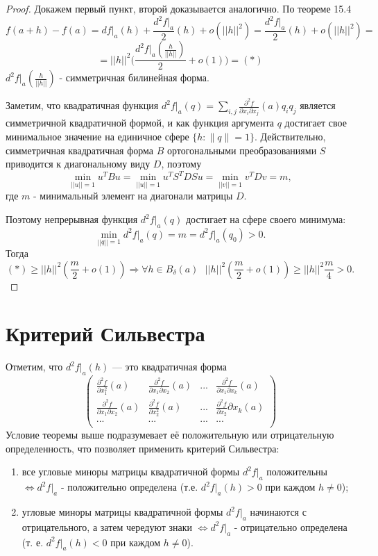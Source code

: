     \begin{proof}
    	Докажем первый пункт, второй доказывается аналогично. По теореме 15.4
    	\[ f(a + h) - f(a) = df|_a(h) + \frac{d^2f|_a}{2}(h) + o(||h||^2) = \frac{d^2f|_a}{2}(h) + o(||h||^2) = \]
    	\[ = ||h||^2 \bigg(\frac{d^2f|_a(\frac{h}{||h||})}{2} + o(1)\bigg) = (*) \]
    	$d^2f|_a(\frac{h}{||h||})$ - симметричная билинейная форма.
    	
    	Заметим, что квадратичная функция $d^2f\bigl|_a(q) = \sum_{i,j}\frac{\partial^2 f}{\partial x_i\partial x_j}(a)q_iq_j$ является симметричной квадратичной формой, и
    	как функция аргумента $q$ достигает свое минимальное значение на единичное сфере $\{h\colon \|q\|=1\}$. Действительно, симметричная квадратичная форма $B$ ортогональными преобразованиями $S$ приводится к диагональному виду $D$, поэтому
    	$$\min_{||u||=1} u^TBu = \min_{||u||=1} u^TS^TDSu = \min_{||v||=1} v^TDv = m,$$
    	где $m$ - минимальный элемент на диагонали матрицы $D$.
    	
    	Поэтому непрерывная функция $d^2f\bigl|_a(q)$ достигает на сфере
    	своего минимума:
    	\[ \min\limits_{||q|| = 1}d^2f\bigl|_a(q) = m=d^2f\bigl|_a(q_0) > 0. \]
    	Тогда
    	\[ (*) \geqslant ||h||^2 (\frac{m}{2} + o(1)) \Rightarrow \forall h \in B_{\delta}(a) \text{ } ||h||^2 (\frac{m}{2} + o(1)) \geqslant ||h||^2 \frac{m}{4} > 0. \]
    \end{proof}
    
    \section{Критерий Сильвестра}
   
    \begin{mention}
   	    Отметим, что $d^2f|_a(h)$ — это квадратичная форма
    	\[ \begin{pmatrix}
    		\frac{\partial^2 f}{\partial x_1^2}(a) & \frac{\partial^2 f}{\partial x_1 \partial x_2}(a) & ... & \frac{\partial^2 f}{\partial x_1 \partial x_k}(a) \\
    		\frac{\partial^2 f}{\partial x_1 \partial x_2}(a) & \frac{\partial^2 f}{\partial x_2^2}(a) & ... & \frac{\partial^2 f}{\partial x_2}{\partial x_k}(a) \\
    		... & ... & ... & ... \\
    	\end{pmatrix} \]
   	    Условие теоремы выше подразумевает её положительную или отрицательную определенность, что позволяет применить критерий Сильвестра:
   	    \begin{enumerate} 
   	    	\item все угловые миноры матрицы квадратичной формы $d^2 f|_a$ положительны $\Leftrightarrow d^2 f|_a$ - положительно определена (т.е. $d^2 f|_a(h) > 0$ при каждом $h \neq 0$);
   	    	\item угловые миноры матрицы квадратичной формы $d^2 f|_a$ начинаются с отрицательного, а затем чередуют знаки $\Leftrightarrow d^2 f|_a$ - отрицательно определена (т. е. $d^2 f|_a(h) < 0$ при каждом $h \neq 0$).
	    \end{enumerate}
    \end{mention}
    
